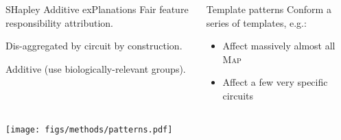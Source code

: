 \documentclass[compress,ignorenonframetext,aspectratio=1610,handout]{beamer}
\begin{document}
\begin{frame}
	
	\begin{columns}
		
		
		\begin{block}{SHapley Additive exPlanations}
				Fair feature responsibility attribution.
				
				Dis-aggregated by circuit by construction.
				
				Additive (use biologically-relevant groups).
		\end{block}
	
		\begin{block}{Template patterns}
			Conform a series of templates, e.g.:
			
			\begin{itemize}
				\item Affect massively almost all \textsc{Map}
				\item Affect a few very specific circuits
			\end{itemize}
			
		\end{block}
	\end{columns}
	
	\pause
	
	\centering
	\texttt{[image: figs/methods/patterns.pdf]}
\end{frame}
\end{document}

